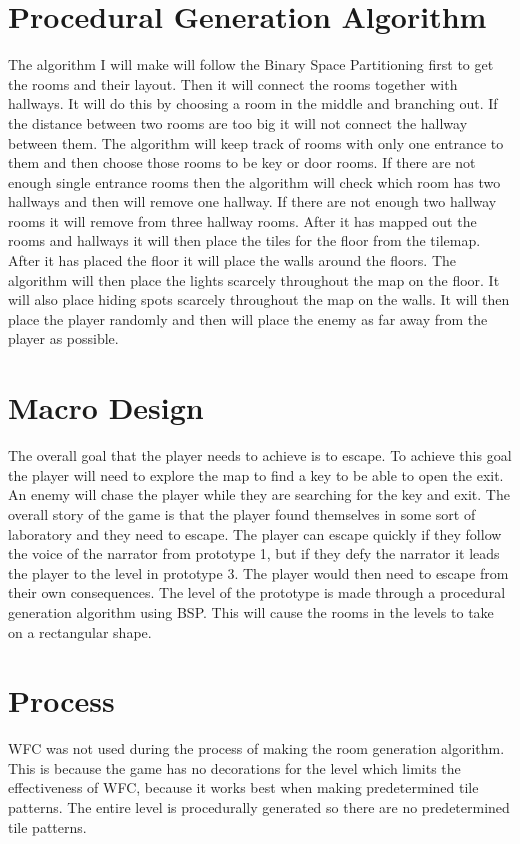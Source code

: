 \documentclass{article}
\begin{document}
\section*{Procedural Generation Algorithm}
The algorithm I will make will follow the Binary Space Partitioning first to get the rooms
and their layout. 
Then it will connect the rooms together with hallways. It will do this by choosing a room in the middle 
and branching out. If the distance between two rooms are too big it will not connect the hallway between
them.
The algorithm will keep track of rooms with only one entrance to them and then choose those rooms to
be key or door rooms. If there are not enough single entrance rooms then the algorithm will check which
room has two hallways and then will remove one hallway. If there are not enough two hallway rooms
it will remove from three hallway rooms.
After it has mapped out the rooms and hallways it will then place the tiles for the floor from the tilemap.
After it has placed the floor it will place the walls around the floors.
The algorithm will then place the lights scarcely throughout the map on the floor.
It will also place hiding spots scarcely throughout the map on the walls.
It will then place the player randomly and then will place the enemy as far away from the player as possible.


\section*{Macro Design}
The overall goal that the player needs to achieve is to escape. To achieve this goal the player will need
to explore the map to find a key to be able to open the exit. An enemy will chase the player while they are
searching for the key and exit.
The overall story of the game is that the player found themselves in some sort of laboratory and they need to escape.
The player can escape quickly if they follow the voice of the narrator from prototype 1, but if they defy the narrator
it leads the player to the level in prototype 3. The player would then need to escape from their own consequences.
The level of the prototype is made through a procedural generation algorithm using BSP. This will cause the rooms in 
the levels to take on a rectangular shape.


\section*{Process}
WFC was not used during the process of making the room generation algorithm. This is because the game has no
decorations for the level which limits the effectiveness of WFC, because it works best when making predetermined 
tile patterns. The entire level is procedurally generated so there are no predetermined tile patterns.
\end{document}
